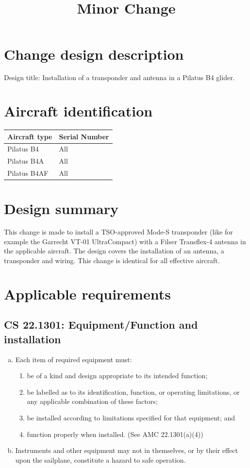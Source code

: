 \documentclass{article}
\begin{document}
\title{Minor Change}
\author{}
\date{}
\maketitle

\section{Change design description}
Design title: Installation of a transponder and antenna in a Pilatus B4 glider.

\section{Aircraft identification}
\begin{tabular}{|l|l|}
\hline
Aircraft type & Serial Number \\
\hline
Pilatus B4 & All \\
Pilatus B4A & All \\
Pilatus B4AF & All \\
\hline
\end{tabular}

\section{Design summary}
This change is made to install a TSO-approved Mode-S transponder (like for example the Garrecht VT-01 UltraCompact) with a Filser Transflex-4 antenna in the applicable aircraft. The design covers the installation of an antenna, a transponder and wiring. This change is identical for all effective aircraft.

\section{Applicable requirements}
\subsection{CS 22.1301:  Equipment/Function and installation}
\begin{enumerate}[(a)]
\item Each item of required equipment must:
	\begin{enumerate}[(1)]
          \item be of a kind and design appropriate to its intended function;
          \item be labelled as to its identification, function, or operating limitations, or any applicable combination of these factors;
          \item be installed according to limitations specified for that equipment; and
          \item function properly when installed. (See AMC 22.1301(a)(4))
	\end{enumerate}
\item Instruments and other equipment may not in themselves, or by their effect upon the sailplane, constitute a hazard to safe operation.
\end{enumerate}
\end{document}
